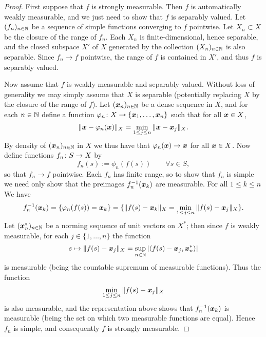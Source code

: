 \begin{proof}
  First suppose that $f$ is strongly measurable.
  Then $f$ is automatically weakly measurable, and we just need to show that $f$ is separably valued.
  Let $(f_n)_{n \in \mathbb{N}}$ be a sequence of simple functions converging to $f$ pointwise.
  Let $X_n \subset X$ be the closure of the range of $f_n$.
  Each $X_n$ is finite-dimensional, hence separable, and the closed subspace $X'$ of $X$ generated by the collection $(X_n)_{n \in \mathbb{N}}$ is also separable.
  Since $f_n \to f$ pointwise, the range of $f$ is contained in $X'$, and thus $f$ is separably valued.

  Now assume that $f$ is weakly measurable and separably valued.
  Without loss of generality we may simply assume that $X$ is separable (potentially replacing $X$ by the closure of the range of $f$).
  Let $(\bm{x}_n)_{n \in \mathbb{N}}$ be a dense sequence in $X$, and for each $n \in \mathbb{N}$ define a function $\varphi_n \colon X \rightarrow \{\bm{x}_1,\ldots,\bm{x}_n\}$ such that for all $\bm{x} \in X$,
  \begin{equation*}
    \|\bm{x} - \varphi_n(\bm{x})\|_X = \min_{1 \leq j \leq n} \|\bm{x} - \bm{x}_j\|_X.
  \end{equation*}
  By density of $(\bm{x}_n)_{n \in \mathbb{N}}$ in $X$ we thus have that $\varphi_n(\bm{x}) \to \bm{x}$ for all $\bm{x} \in X$.
  Now define functions $f_n \colon S \rightarrow X$ by
  \begin{equation*}
    f_n(s) := \phi_n(f(s)) \qquad \forall s \in S,
  \end{equation*}
  so that $f_n \to f$ pointwise.
  Each $f_n$ has finite range, so to show that $f_n$ is simple we need only show that the preimages $f_n^{-1}(\bm{x}_k)$ are measurable.
  For all $1 \leq k \leq n$ We have
  \begin{equation*}
    f_n^{-1}(\bm{x}_k)
    = \{\varphi_n(f(s)) = \bm{x}_k \}
    = \{\|f(s) - \bm{x}_k\|_X = \min_{1 \leq j \leq n} \|f(s) - \bm{x}_j\|_X \}.
  \end{equation*}
  Let $(\bm{x}_n^*)_{n \in \mathbb{N}}$ be a norming sequence of unit vectors on $X^*$; then since $f$ is weakly measurable, for each $j \in \{1,\ldots,n\}$ the function
  \begin{equation*}
    s \mapsto \|f(s) - \bm{x}_j\|_X = \sup_{n \in \mathbb{N}} |\langle f(s) - \bm{x}_j, \bm{x}_n^* \rangle|
  \end{equation*}
  is measurable (being the countable supremum of measurable functions).
  Thus the function
  \begin{equation*}
    \min_{1 \leq j \leq n} \|f(s) - \bm{x}_j\|_X
  \end{equation*}
  is also measurable, and the representation above shows that $f_n^{-1}(\bm{x}_k)$ is measurable (being the set on which two measurable functions are equal).
  Hence $f_n$ is simple, and consequently $f$ is strongly measurable.
\end{proof}

